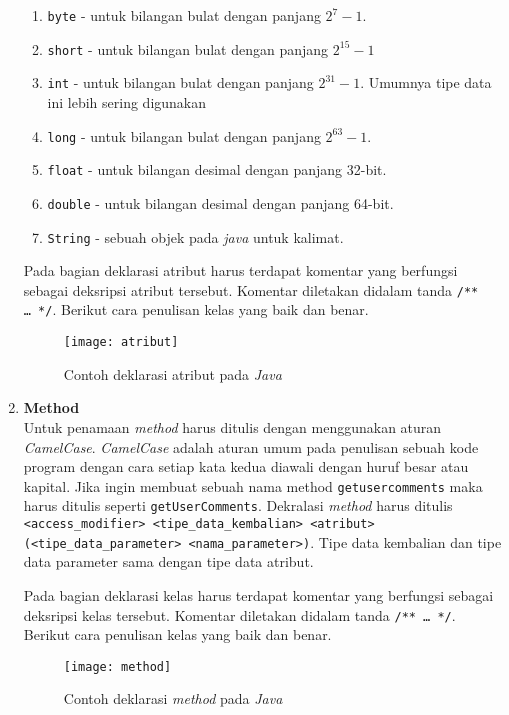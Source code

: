 \begin{enumerate}
    \begin{enumerate}
      \item {\tt byte} - untuk bilangan bulat dengan panjang $2^7 -1$.
      \item {\tt short} - untuk bilangan bulat dengan panjang $2^{15} -1$
      \item {\tt int} - untuk bilangan bulat dengan panjang $2^{31} -1$. Umumnya tipe data ini lebih sering digunakan
      \item {\tt long} - untuk bilangan bulat dengan panjang $2^{63} -1$.
      \item {\tt float} - untuk bilangan desimal dengan panjang 32-bit.
      \item {\tt double} - untuk bilangan desimal dengan panjang 64-bit.
      \item {\tt String} - sebuah objek pada {\it java} untuk kalimat.
    \end{enumerate}
  Pada bagian deklarasi atribut harus terdapat komentar yang berfungsi sebagai deksripsi atribut tersebut. Komentar diletakan didalam tanda {\tt /** \dots\ */}. Berikut cara penulisan kelas yang baik dan benar.
	\begin{figure}[H]
	  \centering  
	  \texttt{[image: atribut]}
	  \caption[Contoh deklarasi atribut pada {\it Java}]{Contoh deklarasi atribut pada {\it Java}}
	  \label{fig:atribut} 
    \end{figure}
  \item \textbf{Method}\\
  Untuk penamaan {\it method} harus ditulis dengan menggunakan aturan {\it CamelCase}. {\it CamelCase} adalah aturan umum pada penulisan sebuah kode program dengan cara setiap kata kedua diawali dengan huruf besar atau kapital. Jika ingin membuat sebuah nama {method} {\tt getusercomments} maka harus ditulis seperti {\tt getUserComments}. Dekralasi {\it method} harus ditulis {\tt <access\_modifier> <tipe\_data\_kembalian> <atribut>(<tipe\_data\_parameter> <nama\_parameter>)}. Tipe data kembalian dan tipe data parameter sama dengan tipe data atribut.
  
  Pada bagian deklarasi kelas harus terdapat komentar yang berfungsi sebagai deksripsi kelas tersebut. Komentar diletakan didalam tanda {\tt /** \dots\ */}. Berikut cara penulisan kelas yang baik dan benar.
	\begin{figure}[H]
	  \centering  
	  \texttt{[image: method]}
	  \caption[Contoh deklarasi {\it method} pada {\it Java}]{Contoh deklarasi {\it method} pada {\it Java}}
	  \label{fig:method} 
    \end{figure}
\end{enumerate}






